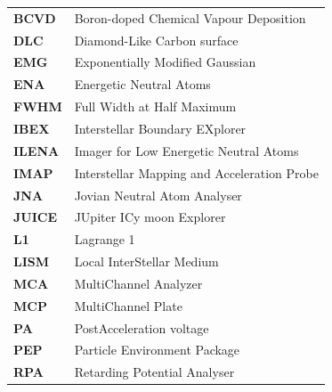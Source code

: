 \documentclass[a4paper, 12pt, abstracton]{scrartcl}
\begin{document}
	\begin{tabular}{>{\bfseries}l|l}
		
		BCVD  & Boron-doped Chemical Vapour Deposition \\ 
		
		DLC   & Diamond-Like Carbon surface \\ 
		
		EMG   & Exponentially Modified Gaussian \\ 
		
		ENA   & Energetic Neutral Atoms \\ 
		
		FWHM  & Full Width at Half Maximum \\ 
		
		IBEX  & Interstellar Boundary EXplorer \\ 
		
		ILENA & Imager for Low Energetic Neutral Atoms \\ 
		
		IMAP  & Interstellar Mapping and Acceleration Probe \\ 
		
		JNA   & Jovian Neutral Atom Analyser \\ 
		
		JUICE & JUpiter ICy moon Explorer \\ 
		
		L1    & Lagrange 1 \\
		
		LISM  & Local InterStellar Medium\\
		
		MCA   & MultiChannel Analyzer \\ 
		
		MCP   & MultiChannel Plate \\ 
		
		PA    & PostAcceleration voltage \\ 
		
		PEP   & Particle Environment Package \\
		
		RPA   & Retarding Potential Analyser \\
		
	\end{tabular}
	\newpage
	\thispagestyle{empty}
	\null
	\newpage
	

	
	\newpage
	\thispagestyle{empty}
	\null
	\newpage
	
	\newpage
	
	\clearpage
	\newpage
	\thispagestyle{empty}
	\null
	\newpage
	\clearpage
	
	\newpage
	\thispagestyle{empty}
	\null
	\newpage
	
	\clearpage
	
	\clearpage
	
	\clearpage
	
\end{document}
